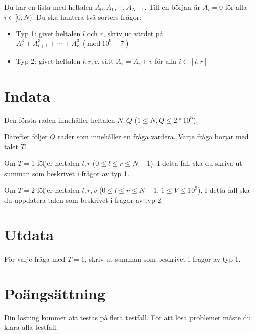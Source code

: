 \newcommand{\Mod}[1]{\ (\mathrm{mod}\ #1)}
Du har en lista med heltalen $A_0, A_1, \cdots, A_{N-1}$. Till en början är $A_i=0$ för alla $i \in [0,N)$.
Du ska hantera två sorters frågor:

\begin{itemize}
    \item Typ 1: givet heltalen $l$ och $r$, skriv ut värdet på  $A_l^3 + A_{l+1}^3 + \cdots + A_{r}^3 \Mod{10^9+7}$
    \item Typ 2: givet heltalen $l,r,v$, sätt $A_i=A_i+v$ för alla $i \in [l,r]$
\end{itemize}


\section*{Indata}
Den första raden innehåller heltalen $N, Q$ ($1 \leq N, Q \leq 2*10^5$).

Därefter följer $Q$ rader som innehåller en fråga vardera. Varje fråga börjar med talet $T$.

Om $T=1$ följer heltalen $l, r$ ($0 \leq l \leq r \leq N - 1$). I detta fall ska du skriva ut summan som beskrivet i frågor av typ 1.

Om $T=2$ följer heltalen $l, r, v$ ($0 \leq l \leq r \leq N - 1$, $1 \leq V \leq 10^9$). I detta fall ska du uppdatera talen som beskrivet i frågor av typ 2.


\section*{Utdata}
För varje fråga med $T=1$, skriv ut summan som beskrivet i frågor av typ 1.

\section*{Poängsättning}
Din lösning kommer att testas på flera testfall.
\noindent
För att lösa problemet måste du klara alla testfall.
